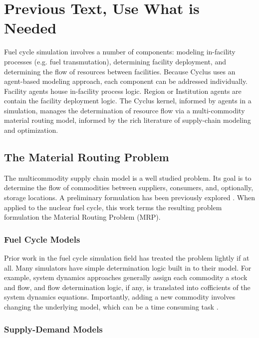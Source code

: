 \section{\textbf{Previous Text, Use What is Needed}}


Fuel cycle simulation involves a number of components: modeling in-facility
processes (e.g. fuel transmutation), determining facility deployment, and
determining the flow of resources between facilities. Because Cyclus uses an
agent-based modeling approach, each component can be addressed
individually. Facility agents house in-facility process logic. Region or
Institution agents are contain the facility deployment logic. The Cyclus kernel,
informed by agents in a simulation, manages the determination of resource flow
via a multi-commodity material routing model, informed by the rich literature of
supply-chain modeling and optimization.

\subsection{The Material Routing Problem}

The multicommodity supply chain model is a well studied problem. Its goal is to
determine the flow of commodities between suppliers, consumers, and, optionally,
storage locations. A preliminary formulation has been previously explored
\cite{gidden_agent-based_2013}. When applied to the nuclear fuel cycle, this
work terms the resulting problem formulation the Material Routing Problem (MRP).

\subsubsection{Fuel Cycle Models}

Prior work in the fuel cycle simulation field has treated the problem lightly if
at all. Many simulators have simple determination logic built in to their
model. For example, system dynamics approaches generally assign each commodity a
stock and flow, and flow determination logic, if any, is translated into
cofficients of the system dynamics equations. Importantly, adding a new
commodity involves changing the underlying model, which can be a time consuming
task \cite{guerin_impact_2009}.

\subsubsection{Supply-Demand Models}

